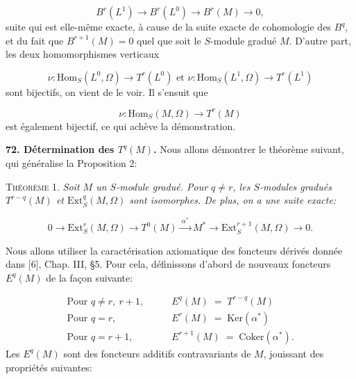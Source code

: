 \begin{equation*}
B^r(L^1) \to B^r(L^0) \to B^r(M) \to 0,
\end{equation*}
suite qui est elle-même exacte, à cause de la suite exacte de cohomologie des $B^q$, et du fait que $B^{r+1}(M) = 0$ quel que soit le $S$-module gradué $M$. D'autre part, les deux homomorphismes verticaux

\begin{equation*}
\nu\colon \mathrm{Hom}_S(L^0, \Omega) \to T^r(L^0) \text{ et } \nu\colon \mathrm{Hom}_S(L^1, \Omega) \to T^r(L^1)
\end{equation*}
sont bijectifs, on vient de le voir. Il s'ensuit que

\begin{equation*}
\nu\colon \mathrm{Hom}_S(M, \Omega) \to T^r(M)
\end{equation*}
est également bijectif, ce qui achève la démonstration.

\textbf{72. Détermination des $T^q(M)$.} Nous allons démontrer le théorème suivant, qui généralise la Proposition 2:

\textsc{Théorème} 1. \textit{Soit $M$ un $S$-module gradué. Pour $q \neq r$, les $S$-modules gradués $T^{r-q}(M)$ et $\mathrm{Ext}_S^q(M, \Omega)$ sont isomorphes. De plus, on a une suite exacte:}

\begin{equation*}
0 \to \mathrm{Ext}_S^r(M, \Omega) \to T^0(M) \xrightarrow{\ \alpha^*\ } M^* \to \mathrm{Ext}_S^{r+1}(M, \Omega) \to 0.
\end{equation*}


Nous allons utiliser la caractérisation axiomatique des foncteurs dérivés donnée dans [6], Chap. III, §5. Pour cela, définissons d'abord de nouveaux foncteurs $E^q(M)$ de la façon suivante:

\begin{equation*}
\begin{array}{ll}
\text{Pour } q \neq r,\ r + 1, \qquad & E^q(M) \;=\; T^{r-q}(M) \\[4pt]
\text{Pour } q = r, \qquad & E^r(M) \;=\; \mathrm{Ker}(\alpha^*) \\[4pt]
\text{Pour } q = r + 1, \qquad & E^{r+1}(M) \;=\; \mathrm{Coker}(\alpha^*).
\end{array}
\end{equation*}
Les $E^q(M)$ sont des foncteurs additifs contravariants de $M$, jouissant des propriétés suivantes:

